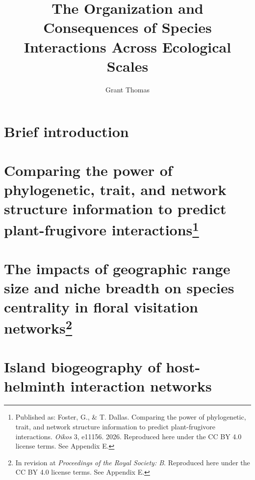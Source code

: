 \documentclass{uscthesis}
\title{The Organization and Consequences of Species Interactions Across Ecological Scales}
\author{Grant Thomas}{Foster}    %
\begin{document}
\chapter{Brief introduction}    %
\chapter[Comparing the power of phylogenetic, trait, and network structure information to predict plant-frugivore interactions.]{Comparing the power of phylogenetic, trait, and network structure information to predict plant-frugivore interactions\footnote{Published as: Foster, G., \& T. Dallas. Comparing the power of phylogenetic, trait, and network structure information to predict plant-frugivore interactions. \textit{Oikos} 3, e11156. 2026. Reproduced here under the CC BY 4.0 license terms. See Appendix E.}}  
           
                             
                                                
                     
                          
\chapter[The impacts of geographic range size and niche breadth on species centrality in floral visitation networks]{The impacts of geographic range size and niche breadth on species centrality in floral visitation networks\footnote{In revision at \textit{Proceedings of the Royal Society: B}. Reproduced here under the CC BY 4.0 license terms. See Appendix E.}}   


                                                                  

\chapter[Island biogeography of host-helminth interaction networks]{Island biogeography of host-helminth interaction networks}   
\end{document}
